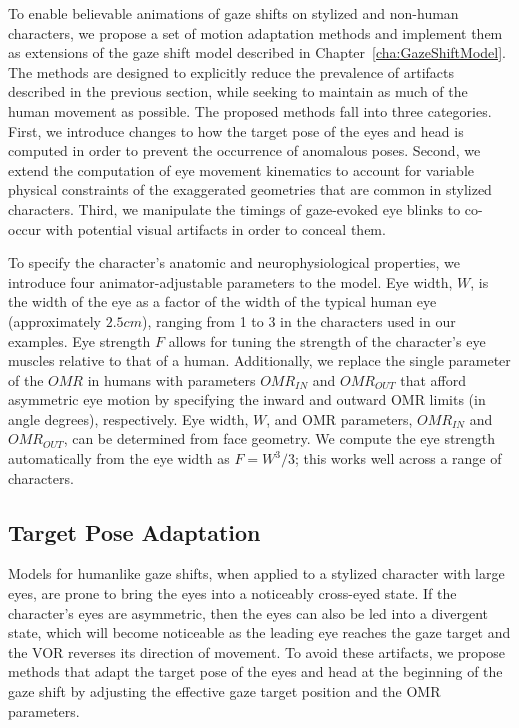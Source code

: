 To enable believable animations of gaze shifts on stylized and non-human characters, we propose a set of motion adaptation methods and implement them as extensions of the gaze shift model described in Chapter~\ref{cha:GazeShiftModel}. The methods are designed to explicitly reduce the prevalence of artifacts described in the previous section, while seeking to maintain as much of the human movement as possible. The proposed methods fall into three categories.
First, we introduce changes to how the target pose of the eyes and head is computed in order to prevent the occurrence of anomalous poses. Second, we extend the computation of eye movement kinematics to account for variable physical constraints of the exaggerated geometries that are common in stylized characters. Third, we manipulate the timings of gaze-evoked eye blinks to co-occur with potential visual artifacts in order to conceal them.

To specify the character's anatomic and neurophysiological properties, we introduce four animator-adjustable parameters to the model. Eye width, $W$, is the width of the eye as a factor of the width of the typical human eye (approximately $2.5 cm$), ranging from 1 to 3 in the characters used in our examples. Eye strength $F$ allows for tuning the strength of the character's eye muscles relative to that of a human. Additionally, we replace the single parameter of the $OMR$ in humans with parameters $OMR_{IN}$ and $OMR_{OUT}$ that afford asymmetric eye motion by specifying the inward and outward OMR limits (in angle degrees), respectively. Eye width, $W$, and OMR parameters, $OMR_{IN}$ and $OMR_{OUT}$, can be determined from face geometry. We compute the eye strength automatically from the eye width as $F = W^3/3$; this works well across a range of characters.

\subsection{Target Pose Adaptation}
\label{sec:StylizedGazeTargetPoseAdaptation}

Models for humanlike gaze shifts, when applied to a stylized character with large eyes, are prone to bring the eyes into a noticeably cross-eyed state. If the character's eyes are asymmetric, then the eyes can also be led into a divergent state, which will become noticeable as the leading eye reaches the gaze target and the VOR reverses its direction of movement. To avoid these artifacts, we propose methods that adapt the target pose of the eyes and head at the beginning of the gaze shift by adjusting the effective gaze target position and the OMR parameters.

